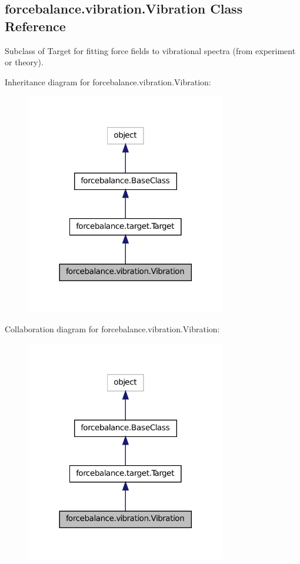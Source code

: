 \hypertarget{classforcebalance_1_1vibration_1_1Vibration}{\subsection{forcebalance.\-vibration.\-Vibration Class Reference}
\label{classforcebalance_1_1vibration_1_1Vibration}
}


Subclass of Target for fitting force fields to vibrational spectra (from experiment or theory).  




Inheritance diagram for forcebalance.\-vibration.\-Vibration\-:\nopagebreak
\begin{figure}[H]
\begin{center}
\leavevmode
\includegraphics[width=248pt]{classforcebalance_1_1vibration_1_1Vibration__inherit__graph}
\end{center}
\end{figure}


Collaboration diagram for forcebalance.\-vibration.\-Vibration\-:\nopagebreak
\begin{figure}[H]
\begin{center}
\leavevmode
\includegraphics[width=248pt]{classforcebalance_1_1vibration_1_1Vibration__coll__graph}
\end{center}
\end{figure}
